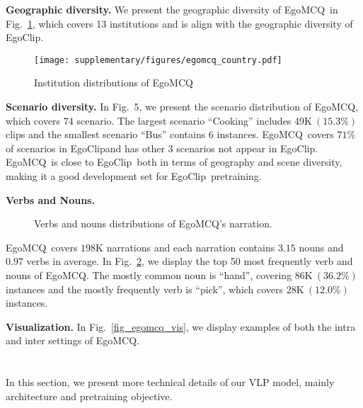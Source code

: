 \documentclass{article}
\newcommand{\dataset}{EgoClip}
\newcommand{\eval}{EgoMCQ}
\begin{document}
\noindent\textbf{Geographic diversity.}
We present the geographic diversity of \eval~in Fig.~\ref{fig_egomcq_country}, which covers 13 institutions and is align with the geographic diversity of \dataset.
\begin{figure}[htb]
\vspace{-0.25cm}
    \centering
    \texttt{[image: supplementary/figures/egomcq\_country.pdf]}
    \caption{Institution distributions of \eval}
    \label{fig_egomcq_country}
\vspace{-0.25cm}
\end{figure} 
\noindent\textbf{Scenario diversity.}
In Fig.~5, we present the scenario distribution of \eval, which covers $74$ scenario. 
The largest scenario ``Cooking'' includes $49\text{K}~(15.3\%)$ clips and the smallest scenario ``Bus'' contains 6 instances.
\eval~covers $71\%$ of scenarios in \dataset and has other $3$ scenarios not appear in \dataset.
\eval~is close to \dataset~both in terms of geography and scene diversity, making it a good development set for \dataset~pretraining.

\noindent\textbf{Verbs and Nouns.}
\begin{figure}[htb]
\vspace{-0.25cm}
\centering
{}
\centering
\caption{Verbs and nouns distributions of \eval's narration.}
\label{fig_egomcq_v_n}
\vspace{-0.25cm}
\end{figure} \eval~covers $198\text{K}$ narrations and each narration contains $3.15$ nouns and $0.97$ verbs in average. 
In Fig.~\ref{fig_egomcq_v_n}, we display the top 50 most frequently verb and nouns of \eval. The mostly common noun is ``hand'', covering $86\text{K}~(36.2\%)$ instances and the mostly frequently verb is ``pick'', which covers $28\text{K}~(12.0\%)$ instances.

\noindent\textbf{Visualization.}
In Fig.~\ref{fig_egomcq_vis}, we display examples of both the intra and inter settings of \eval. \section{\secc}\label{c}
In this section, we present more technical details of our VLP model, mainly architecture and pretraining objective. 
\end{document}
